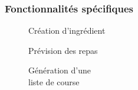 \documentclass{beamer}
\begin{document}
\begin{frame}
	\frametitle{Fonctionnalités spécifiques}
	\begin{multicols}{2}
		\begin{figure}
			\caption{Création d'ingrédient}
		\end{figure}
		\begin{figure}
			\caption{Prévision des repas}
		\end{figure}
		
		\columnbreak

		\begin{figure}
			\caption{Génération d'une\\liste de course}
		\end{figure}


\end{multicols}
\end{frame}
\end{document}
